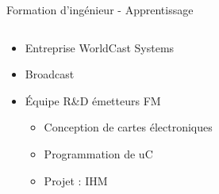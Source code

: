 \documentclass[t,compress,mathserif,12pt,xcolor=dvipsnames]{beamer}
\begin{document}
\begin{frame}[t]{Formation d'ingénieur - Apprentissage}
  \begin{minipage}[t][5.0cm][t]{\textwidth}
    \begin{columns}[T]
      \begin{column}{0.63\textwidth}
        \begin{itemize}
          \item<+-> Entreprise WorldCast Systems
          \item<+-> Broadcast
          \item<+-> \'Equipe R\&D émetteurs FM
          \begin{itemize}
            \item<+-> Conception de cartes électroniques
            \item<+-> Programmation de uC 
            \item<+-> Projet : IHM 
          \end{itemize}
        \end{itemize}
      \end{column}
      \begin{column}{0.04\textwidth}


\end{column}
\end{columns}
\end{minipage}
\end{frame}
\end{document}
